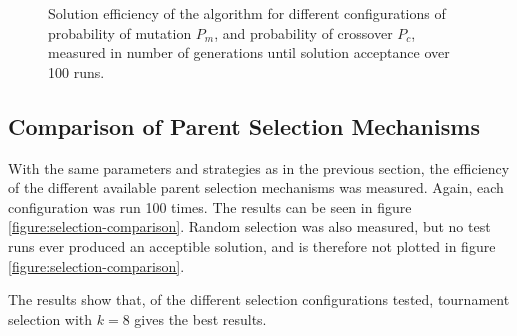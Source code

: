 \documentclass[twocolumn,oneside]{amsart}
\begin{document}
\begin{figure}
\caption{Solution efficiency of the algorithm for different configurations of probability of mutation $ P_m $, and probability of crossover $ P_c $, measured in number of generations until solution acceptance over 100 runs.}
\label{figure:crossover-mutation}
\end{figure}

\subsection{Comparison of Parent Selection Mechanisms}

With the same parameters and strategies as in the previous section, the efficiency of the different available parent selection mechanisms was measured.
Again, each configuration was run 100 times.
The results can be seen in figure \ref{figure:selection-comparison}.
Random selection was also measured, but no test runs ever produced an acceptible solution, and is therefore not plotted in figure \ref{figure:selection-comparison}.

The results show that, of the different selection configurations tested, tournament selection with $ k = 8 $ gives the best results.

\begin{figure}
\end{figure}
\end{document}
